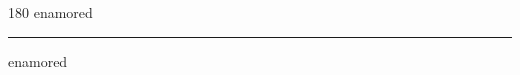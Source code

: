 
\begin{frame}
\begin{center}
\begin{turn}{180}
{\fontsize{2.5cm}{1em}\selectfont enamored}
\end{turn}
\vspace{1em}\par  
\hrule
\vspace{1em}\par  
{\fontsize{2.5cm}{1em}\selectfont enamored}
\end{center}
\end{frame}
